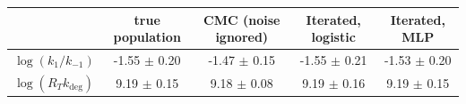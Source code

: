 \begin{tabular}{lcccc}
\toprule
& true population & CMC (noise ignored) & Iterated, logistic & Iterated, MLP \\
\midrule
$\log(k_1/k_{-1})$ & -1.55 $\pm$ 0.20 & -1.47 $\pm$ 0.15 & -1.55 $\pm$ 0.21 & -1.53 $\pm$ 0.20 \\
$\log(R_T k_\mathrm{deg})$ & 9.19 $\pm$ 0.15 & 9.18 $\pm$ 0.08 & 9.19 $\pm$ 0.16 & 9.19 $\pm$ 0.15 \\
\bottomrule
\end{tabular}
